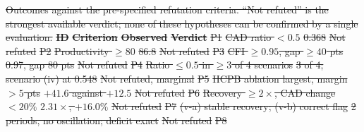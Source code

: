 \documentclass[utf8]{FrontiersinHarvard}
\providecommand{\DIFdel}[1]{{\protect\color{red}\sout{#1}}}                      %
\providecommand{\DIFdelFL}[1]{\DIFdel{#1}} %
\begin{document}
{%
\DIFdelFL{Outcomes against the pre-specified refutation criteria. ``Not refuted'' is the strongest available verdict; none of these hypotheses can be confirmed by a single evaluation.}}
\textbf{\DIFdelFL{ID}} %
\textbf{\DIFdelFL{Criterion}} %
\textbf{\DIFdelFL{Observed}} %
\textbf{\DIFdelFL{Verdict}}%
\DIFdelFL{P1 }%
\DIFdelFL{CAD ratio $< 0.5$ }%
\DIFdelFL{0.368 }%
\DIFdelFL{Not refuted}%
\DIFdelFL{P2 }%
\DIFdelFL{Productivity $\geq 80$ }%
\DIFdelFL{86.8 }%
\DIFdelFL{Not refuted}%
\DIFdelFL{P3 }%
\DIFdelFL{CFI $\geq 0.95$, gap $\geq 40$ pts }%
\DIFdelFL{0.97, gap 80 pts }%
\DIFdelFL{Not refuted}%
\DIFdelFL{P4 }%
\DIFdelFL{Ratio $\leq 0.5$ in $\geq 3$ of 4 scenarios }%
\DIFdelFL{3 of 4; scenario (iv) at 0.548 }%
\DIFdelFL{Not refuted, marginal}%
\DIFdelFL{P5 }%
\DIFdelFL{HCPB ablation largest, margin $> 5$ pts }%
\DIFdelFL{$+41.6$ against $+12.5$ }%
\DIFdelFL{Not refuted}%
\DIFdelFL{P6 }%
\DIFdelFL{Recovery $\geq 2\times$, CAD change $< 20\%$ }%
\DIFdelFL{$2.31\times$, $+16.0\%$ }%
\DIFdelFL{Not refuted}%
\DIFdelFL{P7 }%
\DIFdelFL{(v-a) stable recovery; (v-b) correct flag }%
\DIFdelFL{2 periods, no oscillation; deficit exact }%
\DIFdelFL{Not refuted}%
\DIFdelFL{P8 }%
\end{document}
